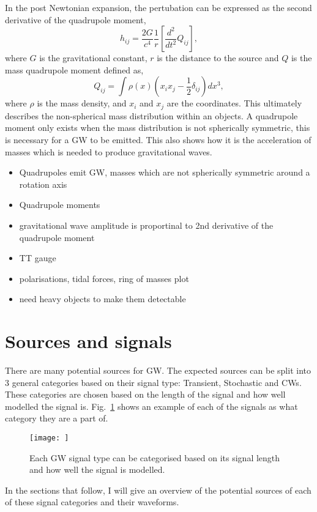 In the post Newtonian expansion, the pertubation can be expressed as the second derivative of the quadrupole moment,
\begin{equation}
    h_{ij} = \frac{2G}{c^4}\frac{1}{r} \left [ \frac{d^2}{dt^2} Q_{ij} \right],
\end{equation}
where $G$ is the gravitational constant, $r$ is the distance to the source and $Q$ is the mass quadrupole moment defined as,
\begin{equation}
    Q_{ij} = \int \rho(x) \left(x_i x_j - \frac{1}{2}\delta_{ij} \right)dx^3,
\end{equation}
where $\rho$ is the mass density, and $x_i$ and $x_j$ are the coordinates.
This ultimately describes the non-spherical mass distribution within an objects. 
A quadrupole moment only exists when the mass distribution is not spherically symmetric, this is necessary for a \ac{GW} to be emitted.
This also shows how it is the acceleration of masses which is needed to produce gravitational waves.


\begin{itemize}
    \item Quadrupoles emit GW, masses which are not spherically symmetric around a rotation axis
    \item Quadrupole moments
    \item gravitational wave amplitude is proportinal to 2nd derivative of the quadrupole moment
    \item TT gauge
    \item polarisations, tidal forces, ring of masses plot
    \item need heavy objects to make them detectable 
\end{itemize}


\section{\label{sources}Sources and signals}

There are many potential sources for \ac{GW}. The expected sources can be split into 3 general categories based on their signal type: Transient, Stochastic and \acp{CW}.
These categories are chosen based on the length of the signal and how well modelled the signal is.
Fig.~\ref{sources:signaltypes} shows an example of each of the signals as what category they are a part of.

\begin{figure}[h]
    \centering
    \texttt{[image: ]}
    \caption{Each \ac{GW} signal type can be categorised based on its signal length and how well the signal is modelled.}
    \label{sources:signaltypes}
\end{figure}
In the sections that follow, I will give an overview of the potential sources of each of these signal categories and their waveforms.


